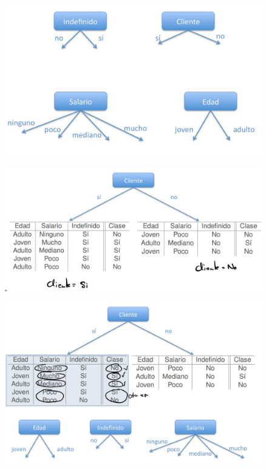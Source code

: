 \documentclass[12pt]{report} %
\begin{document}
\begin{figure}[H]
	{\includegraphics[scale=.2]{Untitled 4.png}}

\end{figure}
\begin{figure}[H]
	{\includegraphics[scale=.2]{Untitled 5.png}}
\end{figure}
\begin{figure}[H]
	{\includegraphics[scale=.2]{Untitled 6.png}}
\end{figure}
\end{document}
